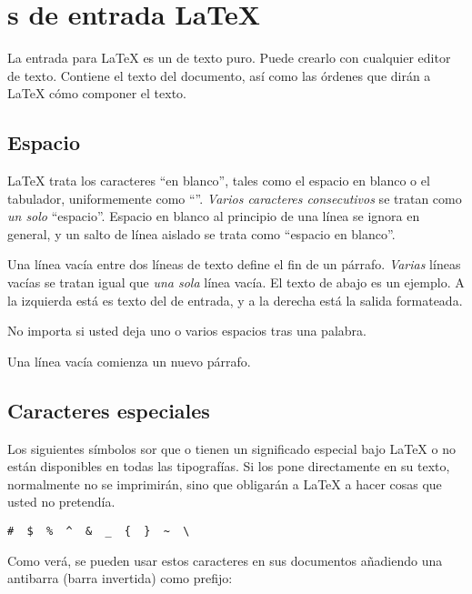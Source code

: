 \section{\Filenomo{}s de entrada \LaTeX{}}

La entrada para \LaTeX{} es un \filenomo{} de texto puro.  Puede crearlo    
con cualquier editor de texto.  Contiene el texto del documento, así
como las órdenes que dirán a \LaTeX{} cómo componer el texto.

\subsection{Espacio}

\LaTeX{} trata los caracteres ``en blanco'', tales como el espacio en blanco o el tabulador, uniformemente como ``''. \emph{Varios caracteres consecutivos}  se tratan como \emph{un solo} ``espacio''.  Espacio en blanco al principio de una línea se ignora en general, y un salto de línea aislado se trata como ``espacio en blanco''.  

Una línea vacía entre dos líneas de texto define el fin de un párrafo. \emph{Varias} líneas vacías se tratan igual que \emph{una sola} línea vacía.  El texto de abajo es un ejemplo.  A la izquierda está es texto del \filenomo{} de entrada, y a la derecha está la salida formateada.

\begin{example}
No importa si usted deja
uno o varios     espacios
tras una palabra.

Una línea vacía comienza
un nuevo párrafo.
\end{example}
 
\subsection{Caracteres especiales}

Los siguientes símbolos sor  que o tienen un significado especial bajo \LaTeX{} o no están disponibles en todas las tipografías.  Si los pone directamente en su texto, normalmente no se imprimirán, sino que obligarán a \LaTeX{} a hacer cosas que usted no pretendía.

\begin{code}
\verb.#  $  %  ^  &  _  {  }  ~  \ . %
\end{code}

Como verá, se pueden usar estos caracteres en sus documentos añadiendo una antibarra (barra invertida) como prefijo:

